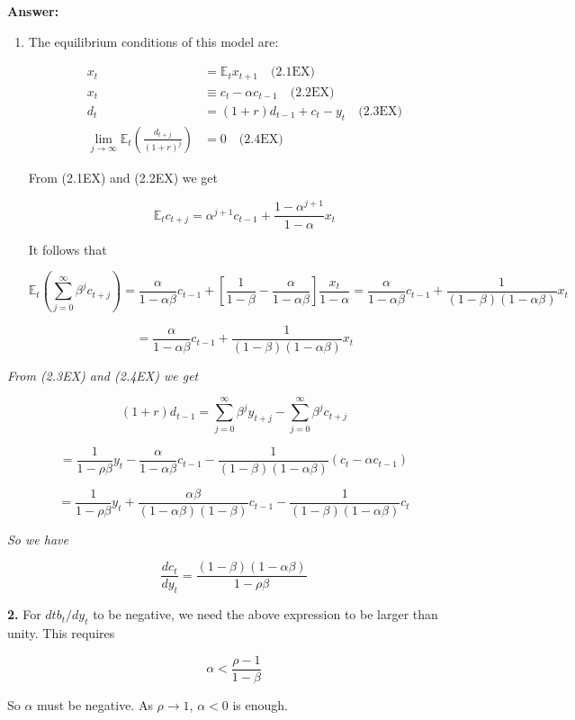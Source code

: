 \documentclass{article}
\begin{document}
\textbf{Answer:}

\begin{enumerate}
    \item The equilibrium conditions of this model are:

    \begin{align}
    x_t &= \mathbb{E}_t x_{t+1} \quad \text{(2.1EX)} \\
    x_t &\equiv c_t - \alpha c_{t-1} \quad \text{(2.2EX)} \\
    d_t &= (1 + r)d_{t-1} + c_t - y_t \quad \text{(2.3EX)} \\
    \lim_{j \to \infty} \mathbb{E}_t \left( \frac{d_{t+j}}{(1 + r)^j} \right) &= 0 \quad \text{(2.4EX)}
    \end{align}

    From (2.1EX) and (2.2EX) we get

    \[
    \mathbb{E}_t c_{t+j} = \alpha^{j+1} c_{t-1} + \frac{1 - \alpha^{j+1}}{1 - \alpha} x_t
    \]

    It follows that

    \[
    \mathbb{E}_t \left( \sum_{j=0}^\infty \beta^j c_{t+j} \right) = \frac{\alpha}{1 - \alpha \beta} c_{t-1} + \left[ \frac{1}{1 - \beta} - \frac{\alpha}{1 - \alpha \beta} \right] \frac{x_t}{1 - \alpha} = \frac{\alpha}{1 - \alpha \beta} c_{t-1} + \frac{1}{(1 - \beta)(1 - \alpha \beta)} x_t
    \]

    \[
= \frac{\alpha}{1 - \alpha \beta} c_{t-1} + \frac{1}{(1 - \beta)(1 - \alpha \beta)} x_t
\]

\end{enumerate}


\textit{From (2.3EX) and (2.4EX) we get}

\[
(1 + r) d_{t-1} = \sum_{j=0}^{\infty} \beta^j y_{t+j} - \sum_{j=0}^{\infty} \beta^j c_{t+j}
\]

\[
= \frac{1}{1 - \rho \beta} y_t - \frac{\alpha}{1 - \alpha \beta} c_{t-1} - \frac{1}{(1 - \beta)(1 - \alpha \beta)} (c_t - \alpha c_{t-1})
\]

\[
= \frac{1}{1 - \rho \beta} y_t + \frac{\alpha \beta}{(1 - \alpha \beta)(1 - \beta)} c_{t-1} - \frac{1}{(1 - \beta)(1 - \alpha \beta)} c_t
\]

\textit{So we have}

\[
\frac{dc_t}{dy_t} = \frac{(1 - \beta)(1 - \alpha \beta)}{1 - \rho \beta}
\]

\textbf{2.} For $d tb_t / dy_t$ to be negative, we need the above expression to be larger than unity. This requires

\[
\alpha < \frac{\rho - 1}{1 - \beta}
\]

So $\alpha$ must be negative. As $\rho \to 1$, $\alpha < 0$ is enough.
\end{document}
